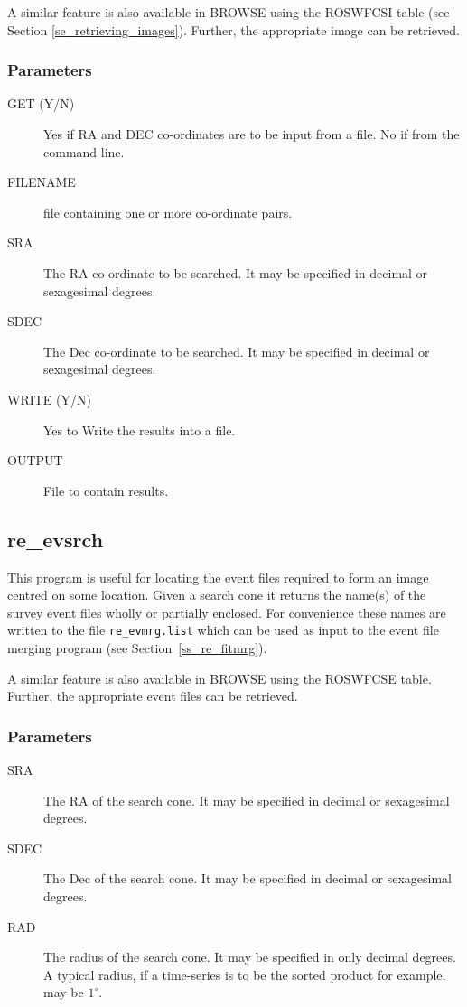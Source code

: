 A similar feature is also available in BROWSE using the ROSWFCSI table
(see Section \ref{se_retrieving_images}).  Further, the appropriate
image can be retrieved.

\subsubsection{Parameters}

\begin{description}
\item[GET (Y/N)  ]
Yes if RA and DEC co-ordinates are to be input from a file.
No if from the command line.
\item[FILENAME  ] file containing one or more co-ordinate pairs.
\item[SRA  ]
The RA co-ordinate to be searched.  It may be specified in
decimal or sexagesimal degrees.
\item[SDEC  ]
The Dec co-ordinate to be searched.  It may be specified in
decimal or sexagesimal degrees.
\item[WRITE (Y/N)  ]
Yes to Write the results into a file.
\item[OUTPUT  ]
File to contain results.
\end{description}

\subsection{\label{ss_re_evsrch}re\_evsrch}

This program is useful for locating the event files required to form an
image centred on some location.  Given a search cone it returns the
name(s) of the survey event files wholly or partially enclosed.  For
convenience these names are written to the file {\tt re\_evmrg.list}
which can be used as input to the event file merging program
 (see Section~\ref{ss_re_fitmrg}).

A similar feature is also available in BROWSE using the ROSWFCSE table.
Further, the appropriate event files can be retrieved.

\subsubsection{Parameters}

\begin{description}

\item[SRA  ]
The RA of the search cone.  It may be specified in
decimal or sexagesimal degrees.
\item[SDEC  ]
The Dec of the search cone.  It may be specified in
decimal or sexagesimal degrees.
\item[RAD  ]
The radius of the search cone.  It may be specified in only decimal
degrees. A typical radius, if a time-series is to be the sorted product
for example, may be $1^{\circ}$.
\end{description}

